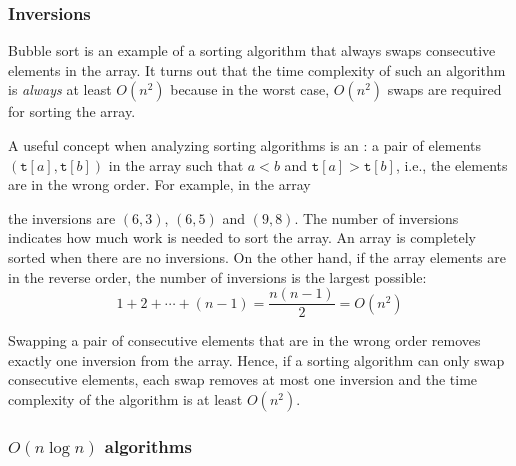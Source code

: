 \subsubsection{Inversions}


Bubble sort is an example of a sorting
algorithm that always swaps consecutive
elements in the array.
It turns out that the time complexity
of such an algorithm is \emph{always}
at least $O(n^2)$ because in the worst case,
$O(n^2)$ swaps are required for sorting the array.

A useful concept when analyzing sorting
algorithms is an :
a pair of elements
$(\texttt{t}[a],\texttt{t}[b])$
in the array such that
$a<b$ and $\texttt{t}[a]>\texttt{t}[b]$,
i.e., the elements are in the wrong order.
For example, in the array
\begin{center}
\end{center}
the inversions are $(6,3)$, $(6,5)$ and $(9,8)$.
The number of inversions indicates
how much work is needed to sort the array.
An array is completely sorted when
there are no inversions.
On the other hand, if the array elements
are in the reverse order,
the number of inversions is the largest possible:
\[1+2+\cdots+(n-1)=\frac{n(n-1)}{2} = O(n^2)\]

Swapping a pair of consecutive elements that are
in the wrong order removes exactly one inversion
from the array.
Hence, if a sorting algorithm can only
swap consecutive elements, each swap removes
at most one inversion and the time complexity
of the algorithm is at least $O(n^2)$.

\subsubsection{$O(n \log n)$ algorithms}


